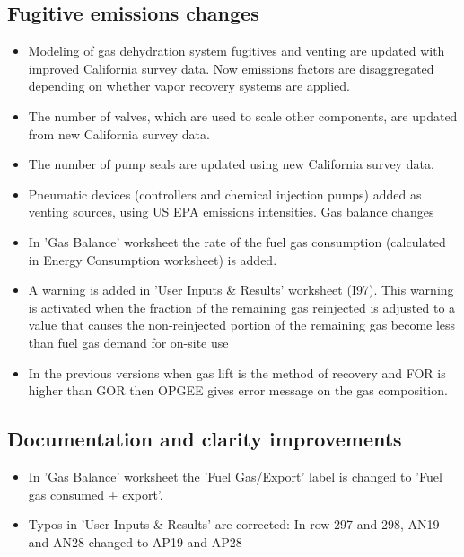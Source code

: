 \documentclass[11pt]{report}
\begin{document}
\subsection{Fugitive emissions changes}
\begin{itemize}
\item Modeling of gas dehydration system fugitives and venting are updated with improved California survey data. Now emissions factors are disaggregated depending on whether vapor recovery systems are applied.

\item The number of valves, which are used to scale other components, are updated from new California survey data.

\item The number of pump seals are updated using new California survey data.

\item Pneumatic devices (controllers and chemical injection pumps) added as venting sources, using US EPA emissions intensities.
Gas balance changes 

\item In 'Gas Balance' worksheet the rate of the fuel gas consumption (calculated in Energy Consumption worksheet) is added.

\item A warning is added in 'User Inputs \& Results' worksheet (I97). This warning is activated when the fraction of the remaining gas reinjected is adjusted to a value that causes the non-reinjected portion of the remaining gas become less than fuel gas demand for on-site use

\item In the previous versions when gas lift is the method of recovery and FOR is higher than GOR then OPGEE gives error message on the gas composition.
\end{itemize}
\subsection{Documentation and clarity improvements} 
\begin{itemize}
\item In 'Gas Balance' worksheet the 'Fuel Gas/Export' label is changed to 'Fuel gas consumed + export'.
\item Typos in 'User Inputs \& Results' are corrected: In row 297 and 298, AN19 and AN28 changed to AP19 and AP28
\end{itemize}
\end{document}
